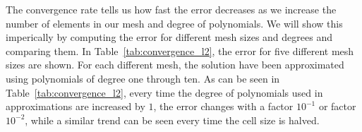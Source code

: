 The convergence rate tells us how fast the error decreases as we increase the number of elements in our mesh and degree of polynomials.
We will show this imperically by computing the error for different mesh sizes and degrees and comparing them. 
In Table~\ref{tab:convergence_l2}, 
the error for five different mesh sizes are shown. 
For each different mesh, the solution have been approximated using polynomials of degree one through ten.
As can be seen in Table~\ref{tab:convergence_l2}, every time the degree of polynomials used in 
approximations are increased by $1$, the error changes with a factor $10^{-1}$ or factor 
$10^{-2}$, while a similar trend can be seen every time the cell size is halved. 

